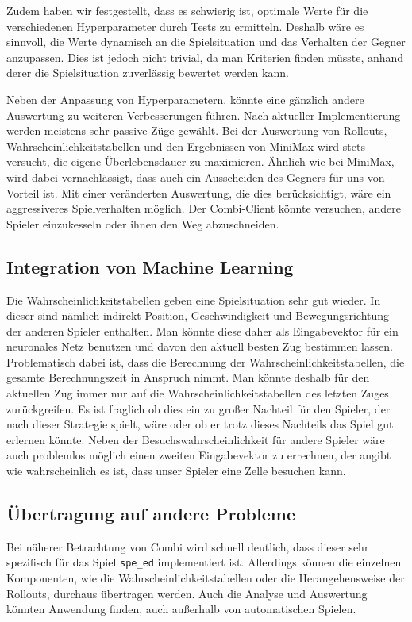 \documentclass[12pt,a4paper]{article}
\begin{document}
Zudem haben wir festgestellt, dass es schwierig ist, optimale Werte für die verschiedenen Hyperparameter durch Tests zu ermitteln. Deshalb wäre es sinnvoll, die Werte dynamisch an die Spielsituation und das Verhalten der Gegner anzupassen. Dies ist jedoch nicht trivial, da man Kriterien finden müsste, anhand derer die Spielsituation zuverlässig bewertet werden kann. 

Neben der Anpassung von Hyperparametern, könnte eine gänzlich andere Auswertung zu weiteren Verbesserungen führen. Nach aktueller Implementierung werden meistens sehr passive Züge gewählt. Bei der Auswertung von Rollouts, Wahrscheinlichkeitstabellen und den Ergebnissen von MiniMax wird stets versucht, die eigene Überlebensdauer zu maximieren. Ähnlich wie bei MiniMax, wird dabei vernachlässigt, dass auch ein Ausscheiden des Gegners für uns von Vorteil ist. Mit einer veränderten Auswertung, die dies berücksichtigt, wäre ein aggressiveres Spielverhalten möglich. Der Combi-Client könnte versuchen, andere Spieler einzukesseln oder ihnen den Weg abzuschneiden.

\subsection{Integration von Machine Learning}
Die Wahrscheinlichkeitstabellen geben eine Spielsituation sehr gut wieder. In dieser sind nämlich indirekt Position, Geschwindigkeit und Bewegungsrichtung der anderen Spieler enthalten. Man könnte diese daher als Eingabevektor für ein neuronales Netz benutzen und davon den aktuell besten Zug bestimmen lassen. Problematisch dabei ist, dass die Berechnung der Wahrscheinlichkeitstabellen, die gesamte Berechnungszeit in Anspruch nimmt. Man könnte deshalb für den aktuellen Zug immer nur auf die Wahrscheinlichkeitstabellen des letzten Zuges zurückgreifen. Es ist fraglich ob dies ein zu großer Nachteil für den Spieler, der nach dieser Strategie spielt, wäre oder ob er trotz dieses Nachteils das Spiel gut erlernen könnte. Neben der Besuchswahrscheinlichkeit für andere Spieler wäre auch problemlos möglich einen zweiten Eingabevektor zu errechnen, der angibt wie wahrscheinlich es ist, dass unser Spieler eine Zelle besuchen kann.

\subsection{Übertragung auf andere Probleme}
Bei näherer Betrachtung von Combi wird schnell deutlich, dass dieser sehr spezifisch für das Spiel \texttt{spe\_ed} implementiert ist. Allerdings können die einzelnen Komponenten, wie die Wahrscheinlichkeitstabellen oder die Herangehensweise der Rollouts, durchaus übertragen werden. Auch die Analyse und Auswertung könnten Anwendung finden, auch außerhalb von automatischen Spielen.
\end{document}
